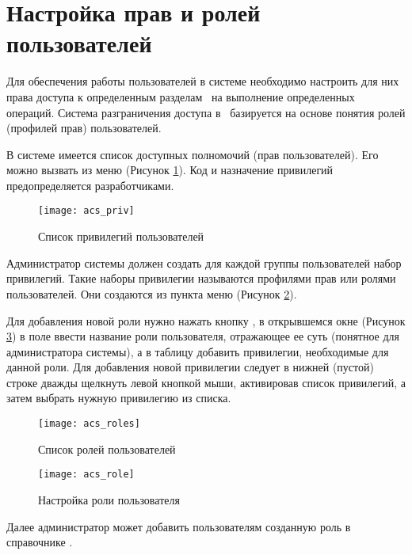 \newpage
\section{Настройка прав и ролей пользователей }

Для обеспечения работы пользователей в системе необходимо настроить для них права доступа к определенным разделам \tmis~на выполнение определенных операций. Система разграничения доступа в \tmis~базируется на основе понятия ролей (профилей прав) пользователей.

В системе имеется список доступных полномочий (прав пользователей). Его можно вызвать из меню  (Рисунок \ref{img_acs_priv}). Код и назначение привилегий предопределяется разработчиками.

\begin{figure}[ht]\centering
 \texttt{[image: acs\_priv]}
 \caption{Список привилегий пользователей}
 \label{img_acs_priv}
\end{figure}

Администратор системы должен создать для каждой группы пользователей набор привилегий. Такие наборы привилегии называются профилями прав или ролями пользователей. Они создаются из пункта меню  (Рисунок \ref{img_acs_roles}).

Для добавления новой роли нужно нажать кнопку , в открывшемся окне (Рисунок \ref{img_acs_role}) в поле  ввести название роли пользователя, отражающее ее суть (понятное для администратора системы), а в таблицу  добавить привилегии, необходимые для данной роли. Для добавления новой привилегии следует в нижней (пустой) строке дважды щелкнуть левой кнопкой мыши, активировав список привилегий, а затем выбрать нужную привилегию из списка. 

\begin{figure}[ht]\centering
 \texttt{[image: acs\_roles]}
 \caption{Список ролей пользователей}
 \label{img_acs_roles}
\end{figure}

\begin{figure}[ht]\centering
 \texttt{[image: acs\_role]}
 \caption{Настройка роли пользователя}
 \label{img_acs_role}
\end{figure}

Далее администратор может добавить пользователям созданную роль в справочнике .

